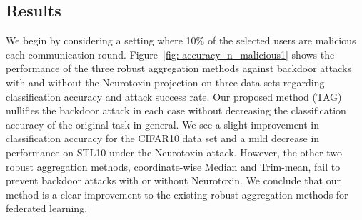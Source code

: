 \documentclass{article} %
\begin{document}
\subsection{Results}

We begin by considering a setting where 10\% of the selected users are malicious each communication round. Figure~\ref{fig: accuracy--n_malicious1} shows the performance of the three robust aggregation methods against backdoor attacks with and without the Neurotoxin projection on three data sets regarding classification accuracy and attack success rate. Our proposed method (TAG) nullifies the backdoor attack in each case without decreasing the classification accuracy of the original task in general. We see a slight improvement in classification accuracy for the CIFAR10 data set and a mild decrease in performance on STL10 under the Neurotoxin attack. However, the other two robust aggregation methods, coordinate-wise Median and Trim-mean, fail to prevent backdoor attacks with or without Neurotoxin. We conclude that our method is a clear improvement to the existing robust aggregation methods for federated learning. 
\end{document}
